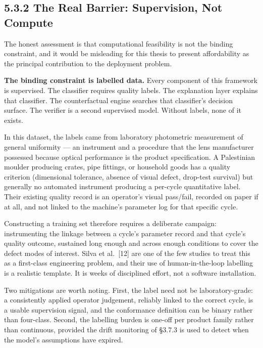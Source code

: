 \hypertarget{the-real-barrier-supervision-not-compute}{%
\subsection{5.3.2 The Real Barrier: Supervision, Not Compute}\label{the-real-barrier-supervision-not-compute}}

The honest assessment is that computational feasibility is not the binding constraint, and it would be misleading for this thesis to present affordability as the principal contribution to the deployment problem.

\textbf{The binding constraint is labelled data.} Every component of this framework is supervised. The classifier requires quality labels. The explanation layer explains that classifier. The counterfactual engine searches that classifier's decision surface. The verifier is a second supervised model. Without labels, none of it exists.

In this dataset, the labels came from laboratory photometric measurement of general uniformity --- an instrument and a procedure that the lens manufacturer possessed because optical performance is the product specification. A Palestinian moulder producing crates, pipe fittings, or household goods has a quality criterion (dimensional tolerance, absence of visual defect, drop-test survival) but generally no automated instrument producing a per-cycle quantitative label. Their existing quality record is an operator's visual pass/fail, recorded on paper if at all, and not linked to the machine's parameter log for that specific cycle.

Constructing a training set therefore requires a deliberate campaign: instrumenting the linkage between a cycle's parameter record and that cycle's quality outcome, sustained long enough and across enough conditions to cover the defect modes of interest. Silva et al.~{[}12{]} are one of the few studies to treat this as a first-class engineering problem, and their use of human-in-the-loop labelling is a realistic template. It is weeks of disciplined effort, not a software installation.

Two mitigations are worth noting. First, the label need not be laboratory-grade: a consistently applied operator judgement, reliably linked to the correct cycle, is a usable supervision signal, and the conformance definition can be binary rather than four-class. Second, the labelling burden is one-off per product family rather than continuous, provided the drift monitoring of §3.7.3 is used to detect when the model's assumptions have expired.


